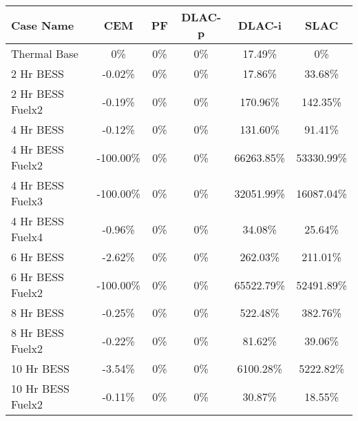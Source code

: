 \begin{tabular}{lccccc}
\toprule
Case Name & CEM & PF & DLAC-p & DLAC-i & SLAC \\
\midrule
Thermal Base & 0\% & 0\% & 0\% & 17.49\% & 0\% \\
2 Hr BESS & -0.02\% & 0\% & 0\% & 17.86\% & 33.68\% \\
2 Hr BESS Fuelx2 & -0.19\% & 0\% & 0\% & 170.96\% & 142.35\% \\
4 Hr BESS & -0.12\% & 0\% & 0\% & 131.60\% & 91.41\% \\
4 Hr BESS Fuelx2 & -100.00\% & 0\% & 0\% & 66263.85\% & 53330.99\% \\
4 Hr BESS Fuelx3 & -100.00\% & 0\% & 0\% & 32051.99\% & 16087.04\% \\
4 Hr BESS Fuelx4 & -0.96\% & 0\% & 0\% & 34.08\% & 25.64\% \\
6 Hr BESS & -2.62\% & 0\% & 0\% & 262.03\% & 211.01\% \\
6 Hr BESS Fuelx2 & -100.00\% & 0\% & 0\% & 65522.79\% & 52491.89\% \\
8 Hr BESS & -0.25\% & 0\% & 0\% & 522.48\% & 382.76\% \\
8 Hr BESS Fuelx2 & -0.22\% & 0\% & 0\% & 81.62\% & 39.06\% \\
10 Hr BESS & -3.54\% & 0\% & 0\% & 6100.28\% & 5222.82\% \\
10 Hr BESS Fuelx2 & -0.11\% & 0\% & 0\% & 30.87\% & 18.55\% \\
\bottomrule
\end{tabular}
